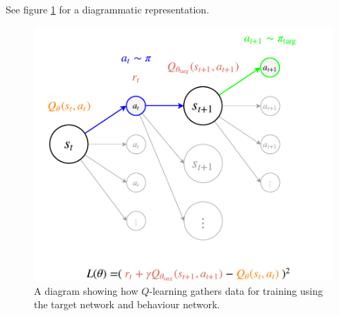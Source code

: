 \documentclass[journal, onecolumn, 12pt, draftclsnofoot]{IEEEtran}
\begin{document}
		See figure \ref{fig:state-transition-q-learning-loss-target-networks} for a diagrammatic representation.
		\begin{figure}[ht]
			\begin{center}
			\includegraphics[scale=0.75]{fig/state-transition-q-learning-loss-target-networks.pdf}
			\end{center}
			\caption{A diagram showing how $Q$-learning gathers data for training using the target network and behaviour network.}
			\label{fig:state-transition-q-learning-loss-target-networks}
		\end{figure}
\end{document}
